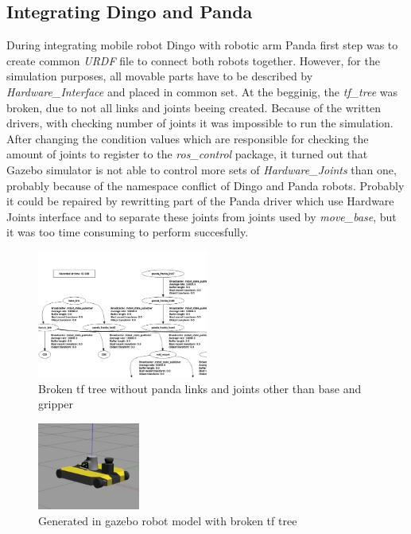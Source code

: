 \documentclass[conference,a4paper]{IEEEtran}
\begin{document}
\subsection{Integrating Dingo and Panda}
During integrating mobile robot Dingo with robotic arm Panda first step was to create common \textit{URDF} file to connect both robots together. However, for the simulation purposes, all movable parts have to be described by \textit{Hardware\_Interface}
and placed in common set. At the begginig, the \textit{tf\_tree} was broken, due to not all links and joints beeing created. Because of the written drivers, with checking number of joints it was impossible to run the simulation. After changing the condition values which are responsible for checking the amount of joints to register to the \textit{ros\_control} package, it turned out that Gazebo simulator is not able to control more sets of \textit{Hardware\_Joints}
than one, probably because of the namespace conflict of Dingo and Panda robots. Probably it could be repaired by rewritting part of the Panda driver which use Hardware Joints interface and to separate these joints from joints used by \textit{move\_base}, but it was too time consuming to perform succesfully.

\begin{figure}[ht]
  \centering
  \includegraphics[width=0.5\textwidth]{img/image_Cropped.png}
  \caption[broken tf tree]{Broken tf tree without panda links and joints other than base and gripper}
\end{figure}
\FloatBarrier

\begin{figure}[ht]
  \centering
  \includegraphics[width=0.3\textwidth]{img/robot.png}
  \caption[robot in gazebo]{Generated in gazebo robot model with broken tf tree}
\end{figure}
\FloatBarrier
\end{document}
